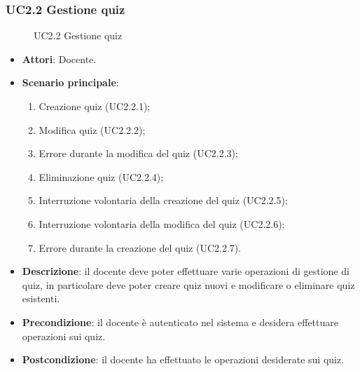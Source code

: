 \subsubsection{UC2.2 Gestione quiz}
\begin{figure}[H]
\centering
\noindent{}
\caption{UC2.2 Gestione quiz}
\end{figure}
\begin{itemize}
\item \textbf{Attori}: Docente.
\item \textbf{Scenario principale}:
\begin{enumerate}
\item Creazione quiz (UC2.2.1);
\item Modifica quiz (UC2.2.2);
\item Errore durante la modifica del quiz (UC2.2.3);
\item Eliminazione quiz (UC2.2.4);
\item Interruzione volontaria della creazione del quiz (UC2.2.5);
\item Interruzione volontaria della modifica del quiz (UC2.2.6);
\item Errore durante la creazione del quiz (UC2.2.7).
\end{enumerate}
\item \textbf{Descrizione}: il docente deve poter effettuare varie operazioni di gestione di quiz, in particolare deve poter creare quiz nuovi e modificare o eliminare quiz esistenti.
\item \textbf{Precondizione}: il docente è autenticato nel sistema e desidera effettuare operazioni sui quiz.
\item \textbf{Postcondizione}: il docente ha effettuato le operazioni desiderate sui quiz.
\end{itemize}
